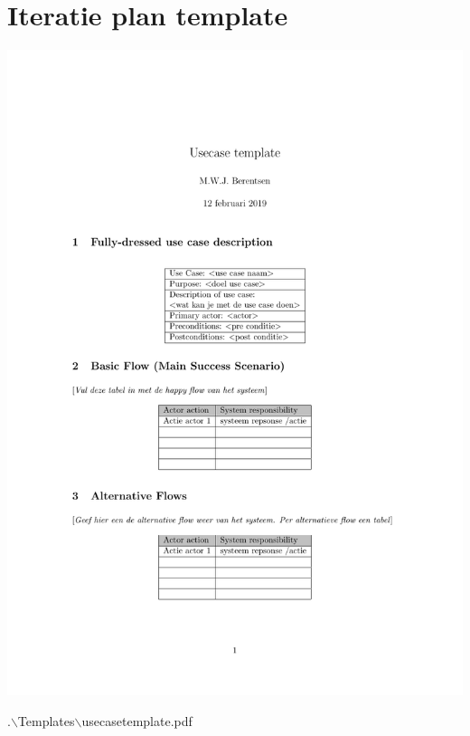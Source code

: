 \documentclass[a4paper, 11pt, oneside]{report}
\begin{document}
\chapter{Iteratie plan template}
\label{app:usecasetemplate}

\begin{center}\includegraphics[page=1,width=.8\linewidth]{Templates/Usecase/usecasetemplate.pdf}\end{center}
.$\backslash$Templates$\backslash$usecasetemplate.pdf
\end{document}
